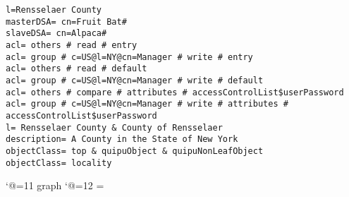 
\scriptsize
\begin{verbatim}
l=Rensselaer County
masterDSA= cn=Fruit Bat#
slaveDSA= cn=Alpaca#
acl= others # read # entry
acl= group # c=US@l=NY@cn=Manager # write # entry
acl= others # read # default
acl= group # c=US@l=NY@cn=Manager # write # default
acl= others # compare # attributes # accessControlList$userPassword
acl= group # c=US@l=NY@cn=Manager # write # attributes # accessControlList$userPassword
l= Rensselaer County & County of Rensselaer
description= A County in the State of New York
objectClass= top & quipuObject & quipuNonLeafObject
objectClass= locality

\end{verbatim}

\catcode`@=11
\expandafter\ifx\csname graph\endcsname\relax {}\box\chardef\insc@unt\graph\fi
\catcode`@=12
\setbox\graph=\empty
